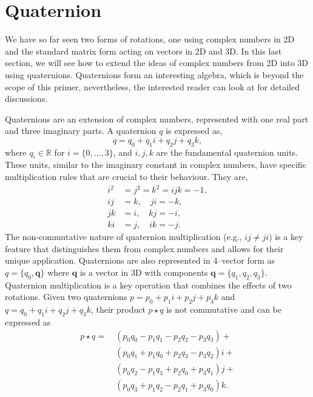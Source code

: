 \documentclass{article}
\def\q{\mathbf{q}}
\def\Rn{\mathbb{R}}
\begin{document}
\section{Quaternion}\label{sec:quat}
We have so far seen two forms of rotations, one using complex numbers in 2D and the standard matrix form acting on vectors in 2D and 3D. In this last section, we will see how to extend the ideas of complex numbers from 2D into 3D using quaternions. Quaternions form an interesting algebra, which is beyond the scope of this primer, nevertheless, the interested reader can look at \cite{hanson2005visualizing, vince2008geometric} for detailed discussions.

Quaternions are an extension of complex numbers, represented with one real part and three imaginary parts. A quaternion $q$ is expressed as,
\begin{equation*}
    q = q_0 + q_1i + q_2j + q_3k,
\end{equation*}
where $q_i \in \Rn$ for $i=\{0, \dots, 3 \}$, and \( i, j, k \) are the fundamental quaternion units. These units, similar to the imaginary constant in complex numbers, have specific multiplication rules that are crucial to their behaviour. They are,
\begin{align*}
    i^2 &= j^2 = k^2 = ijk = -1 ,\\
    ij &= k, \quad ji = -k, \\
    jk &= i, \quad kj = -i, \\
    ki &= j, \quad ik = -j.
\end{align*}
The non-commutative nature of quaternion multiplication (e.g., \( ij \neq ji \)) is a key feature that distinguishes them from complex numbers and allows for their unique application. Quaternions are also represented in 4--vector form as $q = \{ q_0, \q \}$ where $\q$ is a vector in 3D with components $\q = \{ q_1, q_2, q_3 \}$.
Quaternion multiplication is a key operation that combines the effects of two rotations. Given two quaternions \( p = p_0 + p_1i + p_2j + p_3k \) and \( q = q_0 + q_1i + q_2j + q_3k \), their product \( p \star q \) is not commutative and can be expressed as
\begin{align}
  p \star q =\ & (p_0 q_0 - p_1 q_1 - p_2 q_2 - p_3 q_3) + \nonumber \\
         & (p_0 q_1 + p_1 q_0 + p_2 q_3 - p_3 q_2)i + \nonumber \\
         & (p_0 q_2 - p_1 q_3 + p_2 q_0 + p_3 q_1)j + \nonumber \\
         & (p_0 q_3 + p_1 q_2 - p_2 q_1 + p_3 q_0)k. \label{eq:quatMul}
\end{align}
\end{document}
